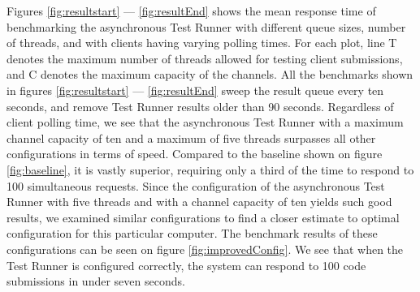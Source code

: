Figures \ref{fig:resultstart} --- \ref{fig:resultEnd} shows the mean response time of benchmarking the asynchronous Test Runner with different queue sizes, number of threads, and with clients having varying polling times.
For each plot, line T denotes the maximum number of threads allowed for testing client submissions, and C denotes the maximum capacity of the channels.
All the benchmarks shown in figures \ref{fig:resultstart} --- \ref{fig:resultEnd} sweep the result queue every ten seconds, and remove Test Runner results older than 90 seconds.
Regardless of client polling time, we see that the asynchronous Test Runner with a maximum channel capacity of ten and a maximum of five threads surpasses all other configurations in terms of speed.
Compared to the baseline shown on figure \ref{fig:baseline}, it is vastly superior, requiring only a third of the time to respond to 100 simultaneous requests.
Since the configuration of the asynchronous Test Runner with five threads and with a channel capacity of ten yields such good results, we examined similar configurations to find a closer estimate to optimal configuration for this particular computer.
The benchmark results of these configurations can be seen on figure \ref{fig:improvedConfig}.
We see that when the Test Runner is configured correctly, the system can respond to 100 code submissions in under seven seconds.

